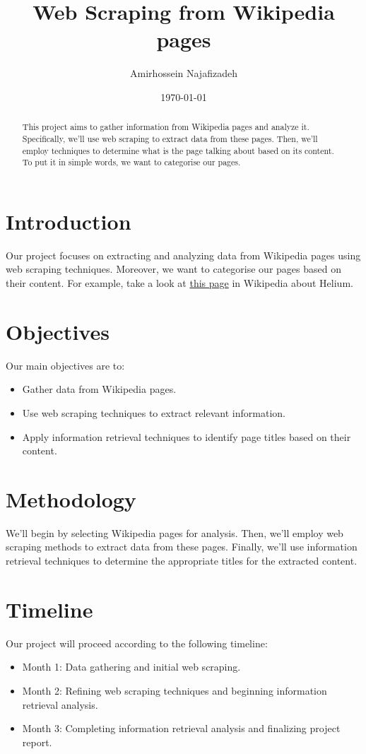 \documentclass{article}
\title{Web Scraping from Wikipedia pages}
\author{Amirhossein Najafizadeh}
\date{\today}
\begin{document}
\maketitle

\begin{abstract}
This project aims to gather information from Wikipedia pages and analyze it. Specifically, we'll use web scraping to extract data from these pages. Then, we'll employ techniques to determine what is the page talking about based on its content.
To put it in simple words, we want to categorise our pages.
\end{abstract}

\section{Introduction}
Our project focuses on extracting and analyzing data from Wikipedia pages using web scraping techniques. Moreover, we want
to categorise our pages based on their content. For example, take a look at \href{https://en.wikipedia.org/wiki/Helium}{this page} in Wikipedia about Helium.

\section{Objectives}
Our main objectives are to:
\begin{itemize}
    \item Gather data from Wikipedia pages.
    \item Use web scraping techniques to extract relevant information.
    \item Apply information retrieval techniques to identify page titles based on their content.
\end{itemize}

\section{Methodology}
We'll begin by selecting Wikipedia pages for analysis. Then, we'll employ web scraping methods to extract data from these pages. Finally, we'll use information retrieval techniques to determine the appropriate titles for the extracted content.

\section{Timeline}
Our project will proceed according to the following timeline:
\begin{itemize}
    \item Month 1: Data gathering and initial web scraping.
    \item Month 2: Refining web scraping techniques and beginning information retrieval analysis.
    \item Month 3: Completing information retrieval analysis and finalizing project report.
\end{itemize}
\end{document}
